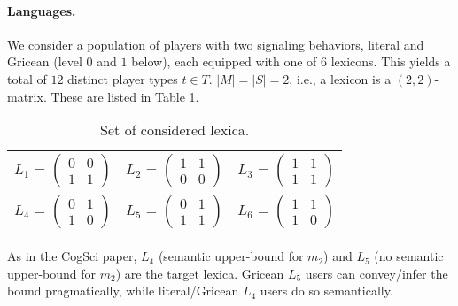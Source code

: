 \documentclass[a4paper]{article}
\begin{document}
\paragraph{Languages.} We consider a population of players with two signaling behaviors, literal and Gricean (level $0$ and $1$ below), each equipped with one of $6$ lexicons. This yields a total of $12$ distinct player types $t \in T$. $|M| = |S| = 2$, i.e., a lexicon is a $(2,2)$-matrix. These are listed in Table \ref{tab:lexica}. 

\begin{table}[h]
\centering 
\begin{tabular}{l c l}
$L_1$ = $\begin{pmatrix} 0 & 0 \\ 1 & 1 \end{pmatrix}$ & 
$L_2$ = $\begin{pmatrix} 1 & 1 \\ 0 & 0 \end{pmatrix}$ & 
$L_3$ = $\begin{pmatrix} 1 & 1 \\ 1 & 1 \end{pmatrix}$\\[0.5cm]

$L_4$ = $\begin{pmatrix} 0 & 1 \\ 1 & 0 \end{pmatrix}$ &
$L_5$ = $\begin{pmatrix} 0 & 1 \\ 1 & 1 \end{pmatrix}$ &
$L_6$ = $\begin{pmatrix} 1 & 1 \\ 1 & 0 \end{pmatrix}$
\end{tabular}
\caption{{\footnotesize Set of considered lexica.}}
\label{tab:lexica}
\end{table}

As in the CogSci paper, $L_4$ (semantic upper-bound for $m_2$) and $L_5$ (no semantic upper-bound for $m_2$) are the target lexica. Gricean $L_5$ users can convey/infer the bound pragmatically, while literal/Gricean $L_4$ users do so semantically.
\end{document}
